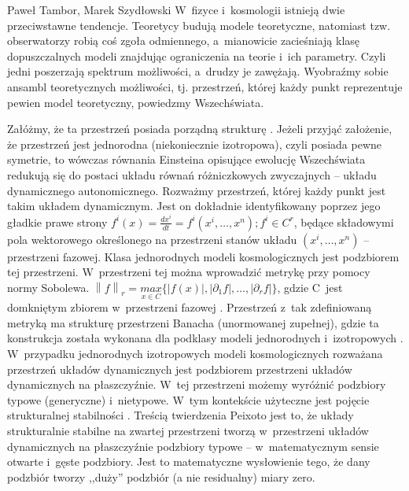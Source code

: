\begin{artplenv}{Paweł Tambor, Marek Szydłowski}
W~fizyce i~kosmologii istnieją dwie przeciwstawne tendencje. Teoretycy budują modele teoretyczne, natomiast tzw. obserwatorzy robią coś zgoła odmiennego, a~mianowicie zacieśniają klasę dopuszczalnych modeli znajdując ograniczenia na teorie i~ich parametry. Czyli jedni poszerzają spektrum możliwości, a~drudzy je zawężają. Wyobraźmy sobie ansambl teoretycznych możliwości, tj. przestrzeń, której każdy punkt reprezentuje pewien model teoretyczny, powiedzmy Wszechświata.

Załóżmy, że ta przestrzeń posiada porządną strukturę
\parencite[][]{szydlowski_metoda_1982}. %
 Jeżeli przyjąć założenie, że przestrzeń jest jednorodna (niekoniecznie izotropowa), czyli posiada pewne symetrie, to wówczas równania Einsteina opisujące ewolucję Wszechświata redukują się do postaci układu równań różniczkowych zwyczajnych -- układu dynamicznego autonomicznego. Rozważmy przestrzeń, której każdy punkt jest takim układem dynamicznym. Jest on dokładnie identyfikowany poprzez jego gładkie prawe strony $f^i\left(x\right)=\frac{\mathit{dx}^i}{\mathit{dt}}=f^i\left(x^i,{\dots},x^n\right);f^i{\in}C^r$, będące składowymi pola wektorowego określonego na przestrzeni stanów układu $\left(x^i,{\dots},x^n\right)$ -- przestrzeni fazowej. Klasa jednorodnych modeli kosmologicznych jest podzbiorem tej przestrzeni. W~przestrzeni tej można wprowadzić metrykę przy pomocy normy Sobolewa. $\left\|f\right\|_r=\underset{x{\in}C}{\mathit{max}}\{\left|f\left(x\right)\right|,\left|{\partial}_1f\right|,{\dots},\left|{\partial}_rf\right|\}$, gdzie C~jest domkniętym zbiorem w~przestrzeni fazowej 
\parencite[][]{perko_differential_1996}. %
 Przestrzeń z~tak zdefiniowaną metryką ma strukturę przestrzeni Banacha (unormowanej zupełnej), gdzie ta konstrukcja została wykonana dla podklasy modeli jednorodnych i~izotropowych 
\parencites[][]{szydlowski_towards_2007}[por.][]{szydlowski_cosmological_2007}. %
 W~przypadku jednorodnych izotropowych modeli kosmologicznych rozważana przestrzeń układów dynamicznych jest podzbiorem przestrzeni układów dynamicznych na płaszczyźnie. W~tej przestrzeni możemy wyróżnić podzbiory typowe (generyczne) i~nietypowe. W~tym kontekście użyteczne jest pojęcie strukturalnej stabilności 
\parencite[][]{tambor_czy_2017}. %
 Treścią twierdzenia Peixoto jest to, że układy strukturalnie stabilne na zwartej przestrzeni tworzą w~przestrzeni układów dynamicznych na płaszczyźnie podzbiory typowe -- w~matematycznym sensie otwarte i~gęste podzbiory. Jest to matematyczne wysłowienie tego, że dany podzbiór tworzy ,,duży'' podzbiór (a nie residualny) miary zero.
 

\end{artplenv}
